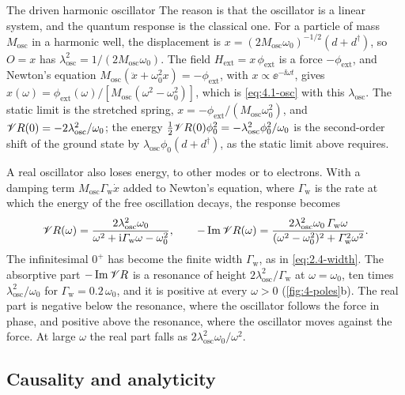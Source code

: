 \begin{workedexample}{The driven harmonic oscillator}
The reason is that the oscillator is a linear system, and the quantum response is the classical one. For a particle of mass $M_{\mathrm{osc}}$ in a harmonic well, the displacement is $x = (2M_{\mathrm{osc}}\omega_0)^{-1/2}(d + d^\dagger)$, so $O = x$ has $\lambda_{\mathrm{osc}}^2 = 1/(2M_{\mathrm{osc}}\omega_0)$. The field $H_{\mathrm{ext}} = x\,\phi_{\mathrm{ext}}$ is a force $-\phi_{\mathrm{ext}}$, and Newton's equation $M_{\mathrm{osc}}(\ddot x + \omega_0^2x) = -\phi_{\mathrm{ext}}$, with $x \propto \ee^{-\ii\omega t}$, gives $x(\omega) = \phi_{\mathrm{ext}}(\omega)/[M_{\mathrm{osc}}(\omega^2 - \omega_0^2)]$, which is \cref{eq:4.1-osc} with this $\lambda_{\mathrm{osc}}$. The static limit is the stretched spring, $x = -\phi_{\mathrm{ext}}/(M_{\mathrm{osc}}\omega_0^2)$, and $\mathscr{V} R(0) = -2\lambda_{\mathrm{osc}}^2/\omega_0$; the energy $\tfrac12\mathscr{V} R(0)\phi_0^2 = -\lambda_{\mathrm{osc}}^2\phi_0^2/\omega_0$ is the second-order shift of the ground state by $\lambda_{\mathrm{osc}}\phi_0(d + d^\dagger)$, as the static limit above requires.

A real oscillator also loses energy, to other modes or to electrons. With a damping term $M_{\mathrm{osc}}\varGamma_{\mathrm{w}}\dot x$ added to Newton's equation, where $\varGamma_{\mathrm{w}}$ is the rate at which the energy of the free oscillation decays, the response becomes
\begin{equation*}
  \mathscr{V} R(\omega) = \frac{2\lambda_{\mathrm{osc}}^2\omega_0}{\omega^2 + \mathrm{i}\varGamma_{\mathrm{w}}\omega - \omega_0^2}, \qquad
  -\operatorname{Im}\mathscr{V} R(\omega) = \frac{2\lambda_{\mathrm{osc}}^2\omega_0\,\varGamma_{\mathrm{w}}\omega}{(\omega^2 - \omega_0^2)^2 + \varGamma_{\mathrm{w}}^2\omega^2} .
\end{equation*}
The infinitesimal $0^+$ has become the finite width $\varGamma_{\mathrm{w}}$, as in \cref{eq:2.4-width}. The absorptive part $-\operatorname{Im}\mathscr{V} R$ is a resonance of height $2\lambda_{\mathrm{osc}}^2/\varGamma_{\mathrm{w}}$ at $\omega = \omega_0$, ten times $\lambda_{\mathrm{osc}}^2/\omega_0$ for $\varGamma_{\mathrm{w}} = 0.2\,\omega_0$, and it is positive at every $\omega > 0$ (\cref{fig:4-poles}b). The real part is negative below the resonance, where the oscillator follows the force in phase, and positive above the resonance, where the oscillator moves against the force. At large $\omega$ the real part falls as $2\lambda_{\mathrm{osc}}^2\omega_0/\omega^2$.
\end{workedexample}

\subsection{Causality and analyticity}

